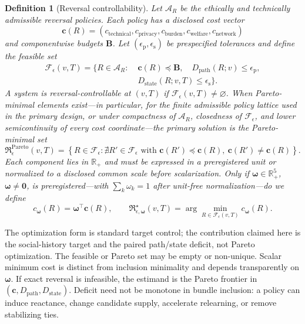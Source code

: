 \documentclass[10pt,a4paper]{article}
\newtheorem{definition}{Definition}
\begin{document}
\begin{definition}[Reversal controllability]
Let $\mathcal A_R$ be the ethically and technically admissible reversal policies. Each policy has a disclosed cost vector
\begin{equation}
\bm c(R)=(c_{\mathrm{technical}},c_{\mathrm{privacy}},c_{\mathrm{burden}},
c_{\mathrm{welfare}},c_{\mathrm{network}})
\end{equation}
and componentwise budgets $\bm B$. Let $(\epsilon_{\mathrm p},\epsilon_{\mathrm s})$ be prespecified tolerances and define the feasible set
\begin{equation}
\begin{aligned}
\mathcal F_\epsilon(v,T)=\{R\in\mathcal A_R:\;&
\bm c(R)\preceq\bm B,\quad D_{\mathrm{path}}(R;v)\leq\epsilon_{\mathrm p},\\
&D_{\mathrm{state}}(R;v,T)\leq\epsilon_{\mathrm s}\}.
\end{aligned}
\end{equation}
A system is reversal-controllable at $(v,T)$ if $\mathcal F_\epsilon(v,T)\neq\varnothing$. When Pareto-minimal elements exist---in particular, for the finite admissible policy lattice used in the primary design, or under compactness of $\mathcal A_R$, closedness of $\mathcal F_\epsilon$, and lower semicontinuity of every cost coordinate---the primary solution is the Pareto-minimal set
\begin{equation}
\mathfrak R^{\mathrm{Pareto}}_\epsilon(v,T)=
\left\{R\in\mathcal F_\epsilon:\nexists R'\in\mathcal F_\epsilon
\text{ with }\bm c(R')\preceq\bm c(R),\ \bm c(R')\neq\bm c(R)\right\}.
\label{eq:minimum-reversal-bundle}
\end{equation}
Each component lies in $\mathbb R_+$ and must be expressed in a preregistered unit or normalized to a disclosed common scale before scalarization. Only if $\bm\omega\in\mathbb R_+^5$, $\bm\omega\neq\bm0$, is preregistered---with $\sum_k\omega_k=1$ after unit-free normalization---do we define
\begin{equation}
c_{\bm\omega}(R)=\bm\omega^\top\bm c(R),\qquad
\mathfrak R^\star_{\epsilon,\bm\omega}(v,T)=
\arg\min_{R\in\mathcal F_\epsilon(v,T)}c_{\bm\omega}(R).
\end{equation}
\end{definition}

The optimization form is standard target control; the contribution claimed here is the social-history target and the paired path/state deficit, not Pareto optimization. The feasible or Pareto set may be empty or non-unique. Scalar minimum cost is distinct from inclusion minimality and depends transparently on $\bm\omega$. If exact reversal is infeasible, the estimand is the Pareto frontier in $(\bm c,D_{\mathrm{path}},D_{\mathrm{state}})$. Deficit need not be monotone in bundle inclusion: a policy can induce reactance, change candidate supply, accelerate relearning, or remove stabilizing ties.
\end{document}
